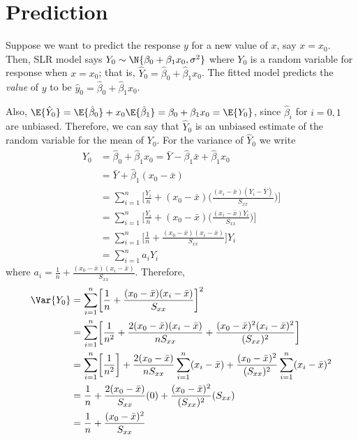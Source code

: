 \section{Prediction}
Suppose we want to predict the response $ y $
for a new value of $ x $, say $ x=x_0 $. Then,
SLR model says
$ Y_0 \sim \N{\beta_0+\beta_1 x_0,\sigma^2} $
where $ Y_0 $ is a random variable for response when $ x=x_0 $;
that is, $ \hat{Y}_0=\hat{\beta}_0+\hat{\beta}_1x_0 $.
The fitted model predicts the \emph{value} of $ y $
to be $ \hat{y}_0=\hat{\beta}_0+\hat{\beta}_1x_0 $.

Also, $\E{\hat{Y}_0}=\E{\hat{\beta}_0}+x_0\E{\hat{\beta}_1}=
  \beta_0+\beta_1x_0=\E{Y_0} $,
since $ \hat{\beta}_i $ for $ i=0,1 $ are unbiased.
Therefore, we can say that $ \hat{Y}_0 $ is an unbiased estimate
of the random variable for the mean of $ Y_0 $. For the variance
of $ \hat{Y}_0 $ we write
\begin{align*}
  \hat{Y}_0
   & =
  \hat{\beta}_0+\hat{\beta}_1x_0=\bar{Y}-\hat{\beta}_1\bar{x}+
  \hat{\beta}_1x_0                                                                          \\
   & =\bar{Y}+\hat{\beta}_1(x_0-\bar{x})                                                    \\
   & =\sum_{i=1}^{n} \biggl[ \frac{Y_i}{n} +(x_0-\bar{x})
  \biggl( \frac{(x_i-\bar{x})(Y_i-\bar{Y})}{S_{xx}} \biggr)  \biggr]                        \\
   & =\sum_{i=1}^{n} \biggl[ \frac{Y_i}{n} +(x_0-\bar{x})
  \biggl( \frac{(x_i-\bar{x})Y_i}{S_{xx}} \biggr)  \biggr]                                  \\
   & =\sum_{i=1}^{n} \biggl[ \frac{1}{n} +\frac{(x_0-\bar{x})(x_i-\bar{x})}{S_{xx}} \biggr]
  Y_i                                                                                       \\
   & =\sum_{i=1}^{n} a_i Y_i
\end{align*}
where $ \displaystyle  a_i=\frac{1}{n} +\frac{(x_0-\bar{x})(x_i-\bar{x})}{S_{xx}} $.
Therefore,
\begin{align*}
  \Var{Y_0}
   & =\sum_{i=1}^{n} \biggl[ \frac{1}{n} +
  \frac{(x_0-\bar{x})(x_i-\bar{x})}{S_{xx}} \biggr]^2                \\
   & = \sum_{i=1}^{n} \biggl[ \frac{1}{n^2}+
    \frac{2(x_0-\bar{x})(x_i-\bar{x})}{nS_{xx}}+
  \frac{(x_0-\bar{x})^2(x_i-\bar{x})^2}{(S_{xx})^2}  \biggr]         \\
   & =\sum_{i=1}^{n} \biggl[ \frac{1}{n^2}  \biggr]+
  \frac{2(x_0-\bar{x})}{n S_{xx}}\sum_{i=1}^{n} (x_i-\bar{x})
  +\frac{(x_0-\bar{x})^2}{(S_{xx})^2} \sum_{i=1}^{n} (x_i-\bar{x})^2 \\
   & =\frac{1}{n} +\frac{2(x_0-\bar{x})}{S_{xx}}(0)+
  \frac{(x_0-\bar{x})^2}{(S_{xx})^2}(S_{xx})                         \\
   & =\frac{1}{n}+\frac{(x_0-\bar{x})^2}{S_{xx}}
\end{align*}
